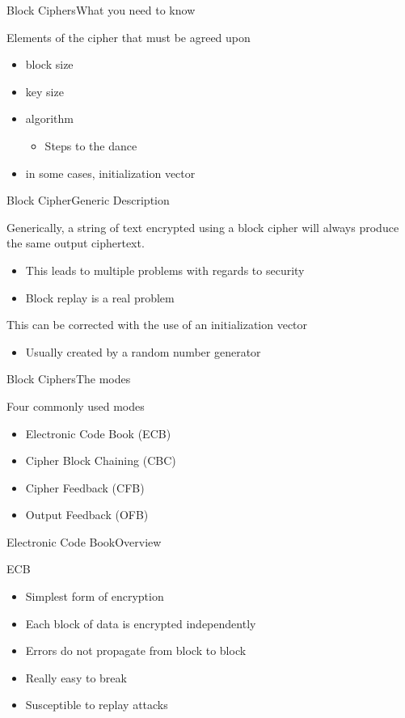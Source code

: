 \documentclass[12pt]{beamer}
\begin{document}
\begin{frame}{Block Ciphers}{What you need to know}
\begin{block}{Elements of the cipher that must be agreed upon}
\begin{itemize}
	\item block size
	\item key size
	\item algorithm
	\begin{itemize}
		\item Steps to the dance
	\end{itemize}
	\item in some cases, initialization vector
\end{itemize}
\end{block}
\end{frame}

\begin{frame}{Block Cipher}{Generic Description}
\begin{block}{}
Generically, a string of text encrypted using a block cipher will always produce the same output ciphertext.
\begin{itemize}
	\item This leads to multiple problems with regards to security
	\item Block replay is a real problem
\end{itemize}
This can be corrected with the use of an initialization vector
\begin{itemize}
	\item Usually created by a random number generator
\end{itemize}
\end{block}
\end{frame}

\begin{frame}{Block Ciphers}{The modes}
\begin{block}{Four commonly used modes}
\begin{itemize}
	\item Electronic Code Book (ECB)
	\item Cipher Block Chaining (CBC)
	\item Cipher Feedback (CFB)
	\item Output Feedback (OFB)
\end{itemize}
\end{block}
\end{frame}

\begin{frame}{Electronic Code Book}{Overview}
\begin{block}{ECB}
\begin{itemize}
	\item Simplest form of encryption
	\item Each block of data is encrypted independently
	\item Errors do not propagate from block to block
	\item Really easy to break
	\item Susceptible to replay attacks
\end{itemize}
\end{block}
\end{frame}
\end{document}
